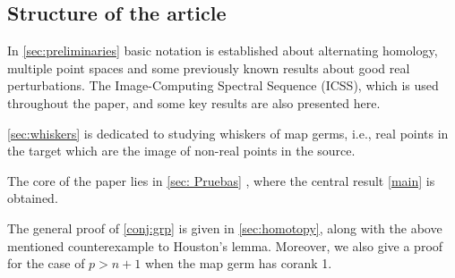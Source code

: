 \documentclass[a4paper,12pt]{amsart}
\begin{document}

%
%




\subsection{Structure of the article}

In \cref{sec:preliminaries} basic notation is established about alternating homology, multiple point spaces and some previously known results about good real perturbations.
The Image-Computing Spectral Sequence (ICSS), which is used throughout the paper, and some key results are also presented 
 here.

\cref{sec:whiskers} is dedicated to studying whiskers of map germs, i.e., real points in the target which are the image of non-real points in the source.

The core of the paper lies in \cref{sec: Pruebas}%
, where the central result \cref{main} is obtained.%


The general proof of \cref{conj:grp} is given in \cref{sec:homotopy}, along with the above mentioned counterexample to Houston's lemma.
Moreover, we also give a proof for the case of $p>n+1$ when the map germ has corank 1.
\end{document}
